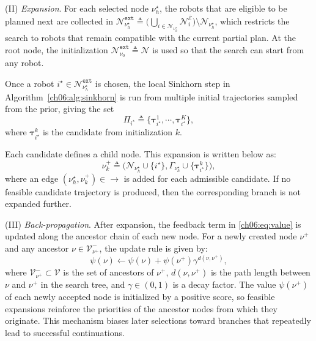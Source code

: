 (II) \emph{Expansion}.
For each selected node $\nu_h^\star$, the robots that are eligible to be
planned next are collected in
$\mathcal{N}_{\nu_h^\star}^{\texttt{ext}}\triangleq
\Big(
\bigcup_{i\in\mathcal{N}_{\nu_h^\star}}
\mathcal{N}_i^{\overline{\mathcal{E}}}
\Big)
\setminus \mathcal{N}_{\nu_h^\star}$,
which restricts the search to robots that remain compatible with the
current partial plan.
At the root node, the initialization
$\mathcal{N}_{\nu_0}^{\texttt{ext}}\triangleq \mathcal{N}$ is used so
that the search can start from any robot.
\begin{revision}
Once a robot
$i^\star\in\mathcal{N}_{\nu_h^\star}^{\texttt{ext}}$ is chosen, the
local Sinkhorn step in Algorithm~\ref{ch06:alg:sinkhorn} is run from
multiple initial trajectories sampled from the prior, giving the set
\[
\Pi_{i^\star}\triangleq
\{\boldsymbol{\tau}_{i^\star}^1,\cdots,
\boldsymbol{\tau}_{i^\star}^K\},
\]
where $\boldsymbol{\tau}_{i^\star}^k$ is the candidate from initialization $k$.
\end{revision}
Each candidate defines a child node.
This expansion is written below as:
\begin{equation}
\label{ch06:eq:expand}
\nu_k^+\triangleq
\big(
\mathcal{N}_{\nu_h^\star}\cup\{i^\star\},
\Gamma_{\nu_h^\star}\cup\{\boldsymbol{\tau}_{i^\star}^k\}
\big),
\end{equation}
where an edge
$(\nu_h^\star,\nu_k^+)\in\rightarrow$
is added for each admissible candidate.
If no feasible candidate trajectory is produced, then the corresponding
branch is not expanded further.

(III) \emph{Back-propagation}.
After expansion, the feedback term in \eqref{ch06:eq:value} is updated
along the ancestor chain of each new node.
For a newly created node $\nu^+$ and any ancestor
$\nu\in\mathcal{V}_{\nu^+}^-$, the update rule is given by:
\begin{equation}
\label{ch06:eq:propagation}
\psi(\nu)\leftarrow
\psi(\nu)+\psi(\nu^+)\gamma^{d(\nu,\nu^+)},
\end{equation}
where $\mathcal{V}_{\nu^+}^-\subset\mathcal{V}$ is the set of ancestors
of $\nu^+$, $d(\nu,\nu^+)$ is the path length between $\nu$ and $\nu^+$
in the search tree, and $\gamma\in(0,1)$ is a decay factor.
The value $\psi(\nu^+)$ of each newly accepted node is initialized by a
positive score, so feasible expansions reinforce the priorities of the
ancestor nodes from which they originate.
This mechanism biases later selections toward branches that repeatedly
lead to successful continuations.

